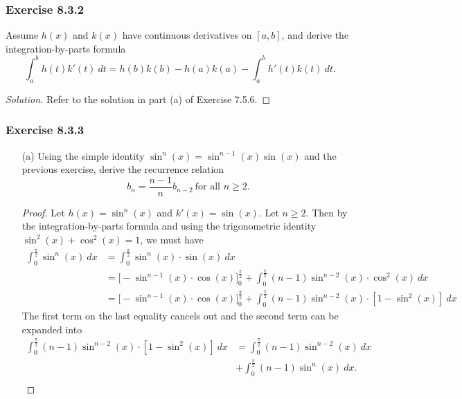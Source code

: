 \subsubsection{Exercise 8.3.2} Assume \( h(x)  \) and \( k(x)  \) have continuous derivatives on \( [a,b]  \), and derive the integration-by-parts formula
\[  \int_{ a }^{ b } h(t) k'(t) \  dt = h(b)k(b) - h(a)k(a) - \int_{ a }^{ b } h'(t) k(t)  \  dt. \]
\begin{proof}[Solution]
Refer to the solution in part (a) of Exercise 7.5.6.
\end{proof}

\subsubsection{Exercise 8.3.3} \begin{enumerate}
    \item[(a)] Using the simple identity \( \sin^{n}(x) = \sin^{n-1}(x) \sin(x)  \) and the previous exercise, derive the recurrence relation 
        \[  b_{n} = \frac{ n-1 }{ n }  b_{n-2} \ \text{for all } n \geq 2. \]
        \begin{proof}
            Let \( h(x) = \sin^{n}(x)  \) and \( k'(x) = \sin(x)  \). Let \( n \geq 2  \). Then by the integration-by-parts formula and using the trigonometric identity \( \sin^{2}(x) + \cos^{2}(x) = 1  \), we must have 
            \begin{align*}
                \int_{ 0 }^{ \frac{ \pi  }{ 2  }   }  \sin^{n}(x) \ dx &= \int_{ 0 }^{ \frac{ \pi }{ 2 }  } \sin^{n}(x) \cdot \sin(x) \  dx  \\
                                                                       &= \Big[ - \sin^{n-1}(x) \cdot \cos(x)  \Big]_{0}^{\frac{ \pi }{ 2 }} + \int_{ 0 }^{ \frac{ \pi }{ 2 }  } (n-1)\sin^{n-2}(x) \cdot \cos^{2}(x)  \  dx \\
                                                                       &=  \Big[ - \sin^{n-1}(x) \cdot \cos(x)  \Big]_{0}^{\frac{ \pi }{ 2 }} +  \int_{ 0 }^{ \frac{ \pi }{ 2 }  } (n-1)\sin^{n-2}(x) \cdot  [ 1 - \sin^{2}(x)  ]  \  dx
            \end{align*}
        The first term on the last equality cancels out and the second term can be expanded into 
        \begin{align*}
            \int_{ 0 }^{ \frac{ \pi }{ 2 }  }  (n-1 ) \sin^{n-2}(x) \cdot [ 1 - \sin^{2}(x) ] \  dx 
                                                                                                    &= \int_{ 0 }^{ \frac{ \pi }{ 2 }   } (n-1) \sin^{n-2}(x)  \   dx \\ &+ \int_{ 0 }^{ \frac{ \pi }{ 2 }  } (n-1) \sin^{n}(x) \  dx. \\

\end{align*}
\end{proof}
\end{enumerate}
